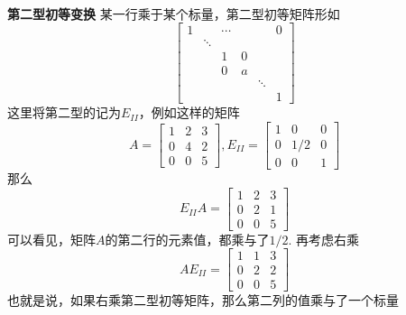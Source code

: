 \paragraph{}
\textbf{第二型初等变换} \:  某一行乘于某个标量，第二型初等矩阵形如
$$
 \begin{bmatrix}
   1 &  & \cdots &  &  & 0 \\
    & \ddots & &  & & \\
    &  & 1 & 0 &  & \\
    & & 0 & a & &  \\
    &   & & & \ddots & \\
    & & & & & 1 
  \end{bmatrix}
$$ 
这里将第二型的记为$E_{II}$，例如这样的矩阵
$$
A =  \begin{bmatrix}
    1 & 2 & 3 \\
    0 & 4 & 2 \\
    0 & 0 & 5
  \end{bmatrix}, E_{II} = \begin{bmatrix}
    1 & 0 & 0 \\
    0 & 1/2 & 0 \\
    0 & 0 & 1  
  \end{bmatrix}
$$
那么
$$
E_{II}A =  \begin{bmatrix}
    1 & 2 & 3 \\
    0 & 2 & 1 \\
    0 & 0 & 5
  \end{bmatrix}
$$
可以看见，矩阵$A$的第二行的元素值，都乘与了$1/2$. 再考虑右乘
$$
AE_{II} =  \begin{bmatrix}
    1 & 1 & 3 \\
    0 & 2 & 2 \\
    0 & 0 & 5
  \end{bmatrix}
$$
也就是说，如果右乘第二型初等矩阵，那么第二列的值乘与了一个标量


